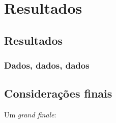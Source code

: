 \documentclass[
	12pt,				%
	openright,			%
	twoside,			%
	a4paper,			%
	english,			%
	brazil				%
	]{abntex2}
\begin{document}
\lipsum[1]

\lipsum[2-3]
\part{Resultados}
\chapter{Resultados}

\section{Dados, dados, dados}

\lipsum[21-22]

\chapter*{Considerações finais} %

Um \emph{grand finale}: \lipsum[31-33]

\postextual

\printbibliography[title=Referências]

%
%
\end{document}

